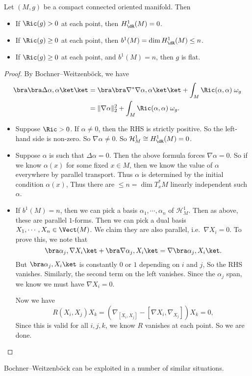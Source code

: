 \documentclass[a4paper]{article}
\begin{document}
\begin{cor}
  Let $(M, g)$ be a compact connected oriented manifold. Then
  \begin{itemize}
    \item If $\Ric(g) > 0$ at each point, then $H_{\dR}^1(M) = 0$.
    \item If $\Ric(g) \geq 0$ at each point, then $b^1(M) = \dim H_{\dR}^1(M) \leq n$.
    \item If $\Ric(g) \geq 0$ at each point, and $b^1(M) = n$, then $g$ is flat.
  \end{itemize}
\end{cor}

\begin{proof}
  By Bochner--Weitzenb\"ock, we have
  \begin{align*}
    \bra \bra \Delta \alpha, \alpha\ket\ket &= \bra \bra \nabla^* \nabla \alpha, \alpha\ket \ket + \int_M \Ric(\alpha, \alpha)\;\omega_g\\
    &= \|\nabla \alpha\|^2_2 + \int_M \Ric(\alpha, \alpha)\;\omega_g.
  \end{align*}

  \begin{itemize}
    \item Suppose $\Ric > 0$. If $\alpha \not= 0$, then the RHS is strictly positive. So the left-hand side is non-zero. So $\nabla \alpha \not =0$. So $\mathcal{H}_M^1 \cong H_{\dR}^1(M) = 0$.

    \item Suppose $\alpha$ is such that $\Delta \alpha = 0$. Then the above formula forces $\nabla \alpha = 0$. So if we know $\alpha(x)$ for some fixed $x \in M$, then we know the value of $\alpha$ everywhere by parallel transport. Thus $\alpha$ is determined by the initial condition $\alpha(x)$, Thus there are $\leq n = \dim T_x^* M$ linearly independent such $\alpha$.

    \item If $b^1(M) = n$, then we can pick a basis $\alpha_1, \cdots, \alpha_n$ of $\mathcal{H}^1_M$. Then as above, these are parallel $1$-forms. Then we can pick a dual basis $X_1, \cdots, X_n \in \Vect(M)$. We claim they are also parallel, i.e.\ $\nabla X_i = 0$. To prove this, we note that
      \[
        \bra \alpha_j, \nabla X_i\ket + \bra \nabla \alpha_j, X_i\ket = \nabla \bra \alpha_j, X_i\ket.
      \]
      But $\bra \alpha_j, X_i\ket$ is constantly $0$ or $1$ depending on $i$ and $j$, So the RHS vanishes. Similarly, the second term on the left vanishes. Since the $\alpha_j$ span, we know we must have $\nabla X_i = 0$.

      Now we have
      \[
        R(X_i, X_j) X_k = (\nabla_{[X_i, X_j]} - [\nabla X_i, \nabla_{X_j}]) X_k = 0,
      \]
      Since this is valid for all $i, j, k$, we know $R$ vanishes at each point. So we are done.
  \end{itemize}
\end{proof}
Bochner--Weitzenb\"ock can be exploited in a number of similar situations.
\end{document}

